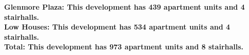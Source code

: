 \bf{Glenmore Plaza}: This development has 439 apartment units and 4 stairhalls.\\\bf{Low Houses}: This development has 534 apartment units and 4 stairhalls.\\\bf{Total}: This development has 973 apartment units and 8 stairhalls.\\